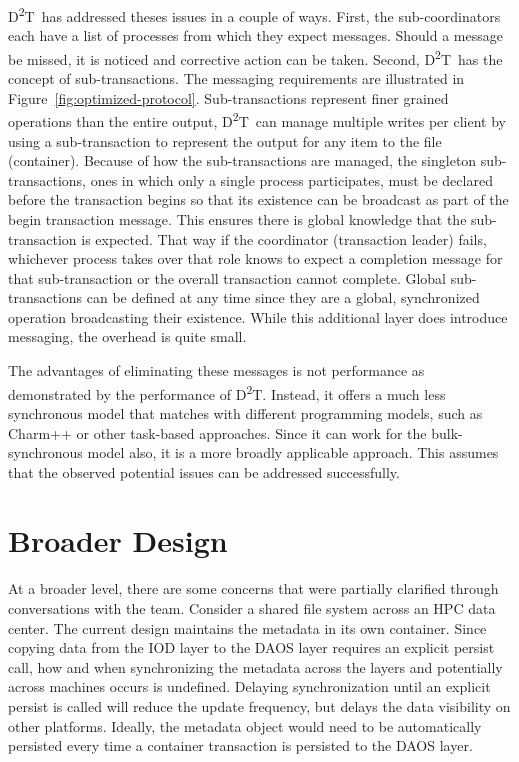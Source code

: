 \documentclass[conference]{IEEEtran}
\newcommand{\DDT}{D\textsuperscript{2}T~}
\newcommand{\DDTns}{D\textsuperscript{2}T}
\begin{document}
\DDT has addressed theses issues in a couple of ways. First, the
sub-coordinators each have a list of processes from which they expect messages.
Should a message be missed, it is noticed and corrective action can be taken.
Second, \DDT has the concept of sub-transactions. The messaging requirements
are illustrated in Figure~\ref{fig:optimized-protocol}.  Sub-transactions
represent finer grained operations than the entire output, \DDT can manage
multiple writes per client by using a sub-transaction to represent the output
for any item to the file (container). Because of how the sub-transactions are
managed, the singleton sub-transactions, ones in which only a single process
participates, must be declared before the transaction begins so that its
existence can be broadcast as part of the begin transaction message. This
ensures there is global knowledge that the sub-transaction is expected.  That
way if the coordinator (transaction leader) fails, whichever process takes over
that role knows to expect a completion message for that sub-transaction or the
overall transaction cannot complete. Global sub-transactions can be defined at
any time since they are a global, synchronized operation broadcasting their
existence. While this additional layer does introduce messaging, the overhead
is quite small.

The advantages of eliminating these messages is not performance as demonstrated
by the performance of \DDTns. Instead, it offers a much less synchronous model
that matches with different programming models, such as Charm++ or other
task-based approaches. Since it can work for the bulk-synchronous model also,
it is a more broadly applicable approach. This assumes that the observed
potential issues can be addressed successfully.

\section{Broader Design}
\label{sec:summary}

At a broader level, there are some concerns that were partially clarified
through conversations with the team.  Consider a shared file system across an
HPC data center. The current design maintains the metadata in its own
container. Since copying data from the IOD layer to the DAOS layer requires an
explicit persist call, how and when synchronizing the metadata across the
layers and potentially across machines occurs is undefined. Delaying
synchronization until an explicit persist is called will reduce the update
frequency, but delays the data visibility on other platforms. Ideally, the
metadata object would need to be automatically persisted every time a container
transaction is persisted to the DAOS layer.
\end{document}
